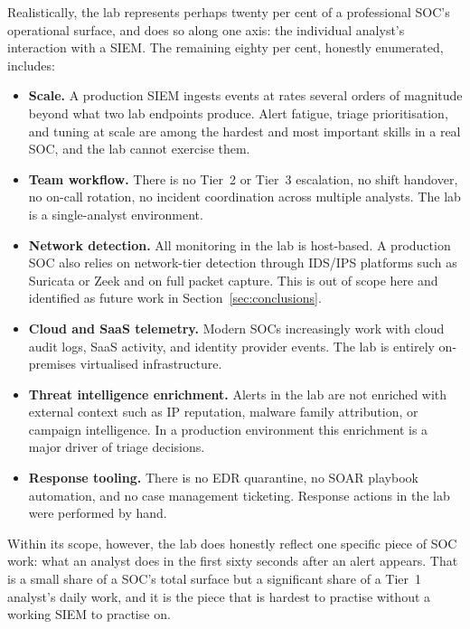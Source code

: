 Realistically, the lab represents perhaps twenty per cent of a professional
SOC's operational surface, and does so along one axis: the individual
analyst's interaction with a SIEM. The remaining eighty per cent, honestly
enumerated, includes:

\begin{itemize}[leftmargin=*]
    \item \textbf{Scale.} A production SIEM ingests events at rates several
          orders of magnitude beyond what two lab endpoints produce. Alert
          fatigue, triage prioritisation, and tuning at scale are among
          the hardest and most important skills in a real SOC, and the lab
          cannot exercise them.
    \item \textbf{Team workflow.} There is no Tier~2 or Tier~3 escalation,
          no shift handover, no on-call rotation, no incident coordination
          across multiple analysts. The lab is a single-analyst
          environment.
    \item \textbf{Network detection.} All monitoring in the lab is
          host-based. A production SOC also relies on network-tier
          detection through IDS/IPS platforms such as Suricata or Zeek and
          on full packet capture. This is out of scope here and identified
          as future work in Section~\ref{sec:conclusions}.
    \item \textbf{Cloud and SaaS telemetry.} Modern SOCs increasingly work
          with cloud audit logs, SaaS activity, and identity provider
          events. The lab is entirely on-premises virtualised
          infrastructure.
    \item \textbf{Threat intelligence enrichment.} Alerts in the lab are
          not enriched with external context such as IP reputation,
          malware family attribution, or campaign intelligence. In a
          production environment this enrichment is a major driver of
          triage decisions.
    \item \textbf{Response tooling.} There is no EDR quarantine, no SOAR
          playbook automation, and no case management ticketing. Response
          actions in the lab were performed by hand.
\end{itemize}

Within its scope, however, the lab does honestly reflect one specific
piece of SOC work: what an analyst does in the first sixty seconds after
an alert appears. That is a small share of a SOC's total surface but a
significant share of a Tier~1 analyst's daily work, and it is the piece
that is hardest to practise without a working SIEM to practise on.

